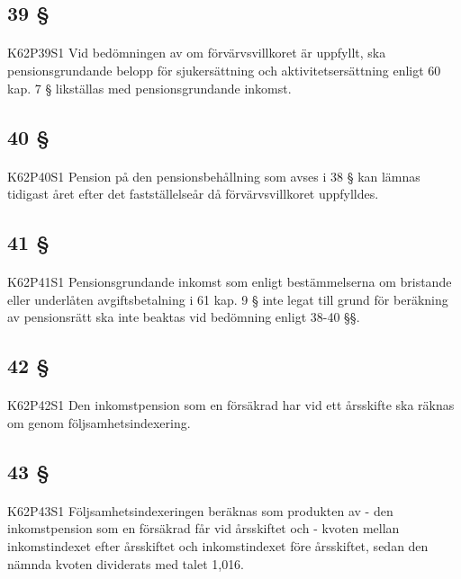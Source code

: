 \documentclass[a4paper,notitlepage,openany,10pt]{book}
\begin{document}
\subsection*{39 §}
\paragraph*{}
{\tiny K62P39S1}
Vid bedömningen av om förvärvsvillkoret är uppfyllt, ska pensionsgrundande belopp för sjukersättning och aktivitetsersättning enligt 60 kap. 7 § likställas med pensionsgrundande inkomst.
\subsection*{40 §}
\paragraph*{}
{\tiny K62P40S1}
Pension på den pensionsbehållning som avses i 38 § kan lämnas tidigast året efter det fastställelseår då förvärvsvillkoret uppfylldes.
\subsection*{41 §}
\paragraph*{}
{\tiny K62P41S1}
Pensionsgrundande inkomst som enligt bestämmelserna om bristande eller underlåten avgiftsbetalning i 61 kap. 9 § inte legat till grund för beräkning av pensionsrätt ska inte beaktas vid bedömning enligt 38-40 §§.
\subsection*{42 §}
\paragraph*{}
{\tiny K62P42S1}
Den inkomstpension som en försäkrad har vid ett årsskifte ska räknas om genom följsamhetsindexering.
\subsection*{43 §}
\paragraph*{}
{\tiny K62P43S1}
Följsamhetsindexeringen beräknas som produkten av
\newline - den inkomstpension som en försäkrad får vid årsskiftet och
\newline - kvoten mellan inkomstindexet efter årsskiftet och inkomstindexet före årsskiftet, sedan den nämnda kvoten dividerats med talet 1,016.
\end{document}
